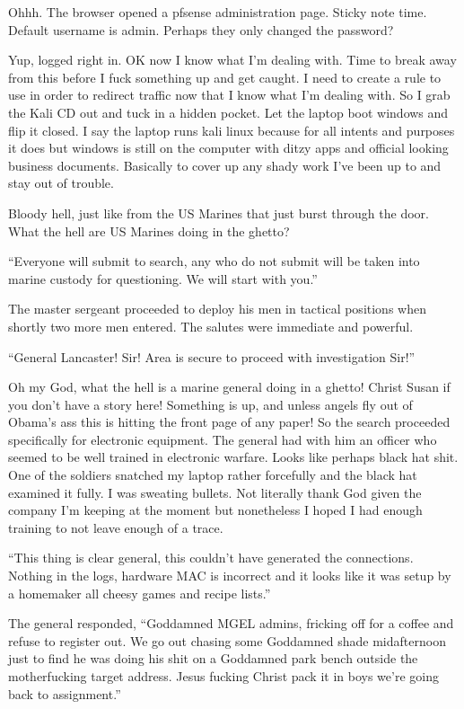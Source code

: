 Ohhh. The browser opened a pfsense administration page. Sticky note time. Default username is admin. Perhaps they only changed the password?

Yup, logged right in. OK now I know what I'm dealing with. Time to break away from this before I fuck something up and get caught. I need to create a rule to use in order to redirect traffic now that I know what I'm dealing with. So I grab the Kali CD out and tuck in a hidden pocket. Let the laptop boot windows and flip it closed. I say the laptop runs kali linux because for all intents and purposes it does but windows is still on the computer with ditzy apps and official looking business documents. Basically to cover up any shady work I've been up to and stay out of trouble.

Bloody hell, just like from the US Marines that just burst through the door. What the hell are US Marines doing in the ghetto?

``Everyone will submit to search, any who do not submit will be taken into marine custody for questioning. We will start with you.''

The master sergeant proceeded to deploy his men in tactical positions when shortly two more men entered. The salutes were immediate and powerful.

``General Lancaster! Sir! Area is secure to proceed with investigation Sir!''

Oh my God, what the hell is a marine general doing in a ghetto! Christ Susan if you don't have a story here! Something is up, and unless angels fly out of Obama's ass this is hitting the front page of any paper! So the search proceeded specifically for electronic equipment. The general had with him an officer who seemed to be well trained in electronic warfare. Looks like perhaps black hat shit. One of the soldiers snatched my laptop rather forcefully and the black hat examined it fully. I was sweating bullets. Not literally thank God given the company I'm keeping at the moment but nonetheless I hoped I had enough training to not leave enough of a trace.

``This thing is clear general, this couldn't have generated the connections. Nothing in the logs, hardware MAC is incorrect and it looks like it was setup by a homemaker all cheesy games and recipe lists.''

The general responded, ``Goddamned MGEL admins, fricking off for a coffee and refuse to register out. We go out chasing some Goddamned shade midafternoon just to find he was doing his shit on a Goddamned park bench outside the motherfucking target address. Jesus fucking Christ pack it in boys we're going back to assignment.''


